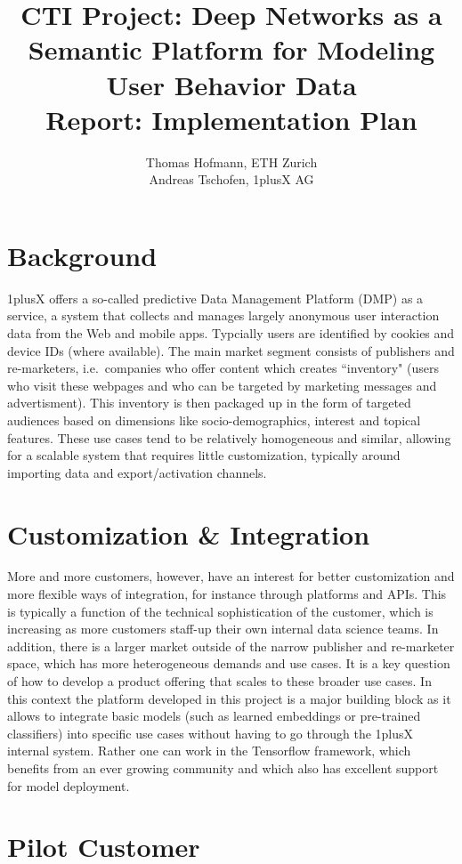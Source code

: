 \documentclass{article}
\author{Thomas Hofmann, ETH Zurich \\ Andreas Tschofen, 1plusX AG}
\title{CTI Project: Deep Networks as a Semantic Platform for Modeling User Behavior Data\\ [2mm] Report: Implementation Plan}
\begin{document}
\maketitle

\section{Background}

1plusX offers a so-called predictive Data Management Platform (DMP) as a service, a system that  collects and manages largely anonymous user interaction data from the Web and mobile apps.  Typcially users are identified by cookies and device IDs (where available). The main market segment consists of publishers and re-marketers, i.e.~companies who offer content which creates ``inventory" (users who visit these webpages and who can be targeted by marketing messages and advertisment). This inventory is then packaged up in the form of targeted audiences based on dimensions like socio-demographics, interest and topical features. These use cases tend to be relatively homogeneous and similar, allowing for a scalable system that requires little customization, typically around importing data and export/activation channels.  

\section{Customization \& Integration}

More and more customers, however, have an interest for better customization and more flexible ways of integration, for instance through platforms and APIs. This is typically a function of the technical sophistication of the customer, which is increasing as more customers staff-up their own internal data science teams. In addition, there is a larger market outside of the narrow publisher and re-marketer space, which has more heterogeneous demands and use cases. It is a key question of how to develop a product offering that scales to these broader use cases. In this context the platform developed in this project is a major building block as it allows to integrate basic models (such as learned embeddings or pre-trained classifiers) into specific use cases without having to go through the 1plusX internal system. Rather one can work in the Tensorflow framework, which benefits from an ever growing community and which also has excellent support for model deployment.

\section{Pilot Customer}
\end{document}
